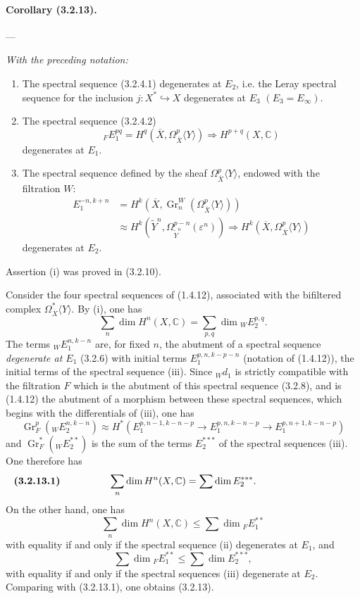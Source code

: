 \documentclass[10pt]{article}
\newcommand{\C}{\mathbb C}
\newcommand{\Gr}{\operatorname{Gr}}
\begin{document}
\paragraph{Corollary (3.2.13).} --- {\itshape With the preceding notation:
\begin{enumerate}[label=(\roman*)]
\item The spectral sequence (3.2.4.1) degenerates at $E_2$, i.e. the Leray spectral sequence for the inclusion $j:X^*\hookrightarrow X$ degenerates at $E_3$ $(E_3=E_\infty)$.
\item The spectral sequence (3.2.4.2)
\[
{}_F E_1^{pq}=H^q(\overline X,\Omega_{\overline X}^p\langle Y\rangle)
\Longrightarrow H^{p+q}(X,\C)
\]
degenerates at $E_1$.
\item The spectral sequence defined by the sheaf $\Omega_{\overline X}^{p}\langle Y\rangle$, endowed with the filtration $W$:
\[
\begin{aligned}
E_1^{-n,k+n}
&=H^k(\overline X,\Gr_n^W(\Omega_{\overline X}^{p}\langle Y\rangle))\\
&\approx H^k(\widetilde Y^n,\Omega_{\widetilde Y^n}^{p-n}(\varepsilon^n))
\Longrightarrow H^k(\overline X,\Omega_{\overline X}^{p}\langle Y\rangle)
\end{aligned}
\]
degenerates at $E_2$.
\end{enumerate}}

Assertion (i) was proved in (3.2.10).

Consider the four spectral sequences of (1.4.12), associated with the bifiltered complex $\Omega_{\overline X}^{*}\langle Y\rangle$. By (i), one has
\[
\sum_n\dim H^n(X,\C)=\sum_{p,q}\dim {}_WE_2^{p,q}.
\]
The terms ${}_WE_1^{n,k-n}$ are, for fixed $n$, the abutment of a spectral sequence \emph{degenerate at $E_1$} (3.2.6) with initial terms $E_1^{p,n,k-p-n}$ (notation of (1.4.12)), the initial terms of the spectral sequence (iii). Since ${}_Wd_1$ is strictly compatible with the filtration $F$ which is the abutment
of this spectral sequence (3.2.8), and is (1.4.12) the abutment of a morphism between these spectral sequences, which begins with the differentials of (iii), one has
\[
\Gr_F^p({}_WE_2^{n,k-n})\approx
H^*(E_1^{p,n-1,k-n-p}\to E_1^{p,n,k-n-p}\to E_1^{p,n+1,k-n-p})
\]
and $\Gr_F^*({}_WE_2^{**})$ is the sum of the terms $E_2^{***}$ of the spectral sequences (iii). One therefore has
\[
\makebox[\textwidth][s]{\textbf{(3.2.13.1)}\hfill$\displaystyle \sum_n \dim H^n(X,\C)=\sum\dim E_2^{***}.$\hfill\phantom{\textbf{(3.2.13.1)}}}
\]
On the other hand, one has
\[
\sum_n \dim H^n(X,\C)\le \sum \dim {}_F E_1^{**}
\]
with equality if and only if the spectral sequence (ii) degenerates at $E_1$, and
\[
\sum\dim {}_F E_1^{**}\le \sum\dim E_2^{***},
\]
with equality if and only if the spectral sequences (iii) degenerate at $E_2$. Comparing with (3.2.13.1), one obtains (3.2.13).
\end{document}
